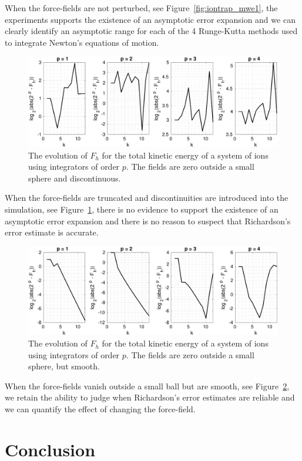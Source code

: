 \documentclass[runningheads]{llncs}
\begin{document}
When the force-fields are not perturbed, see Figure~\ref{fig:iontrap_mwe1}, the experiments supports the existence of an asymptotic error expansion and we can clearly identify an asymptotic range for each of the 4 Runge-Kutta methods used to integrate Newton's equations of motion.
\begin{figure}[h!]
  \centering
  \includegraphics[width=\linewidth]{iontrap_mwe2.pdf}
  \caption{The evolution of $F_h$ for the total kinetic energy of a system of ions using integrators of order $p$. The fields are zero outside a small sphere and discontinuous.}
  \label{fig:iontrap_mwe2}
\end{figure}
When the force-fields are truncated and discontinuities are introduced into the simulation, see Figure~\ref{fig:iontrap_mwe2}, there is no evidence to support the existence of an asymptotic error expansion and there is no reason to suspect that Richardson's error estimate is accurate.
\begin{figure}
  \centering
  \includegraphics[width=\linewidth]{iontrap_mwe4.pdf}
  \caption{The evolution of $F_h$ for the total kinetic energy of a system of ions using integrators of order $p$. The fields are zero outside a small sphere, but smooth.}
  \label{fig:iontrap_mwe4}
\end{figure}
When the force-fields vanish outside a small ball but are smooth, see Figure~\ref{fig:iontrap_mwe4}, we retain the ability to judge when Richardson's error estimates are reliable and we can quantify the effect of changing the force-field.

\section{Conclusion}
\end{document}
